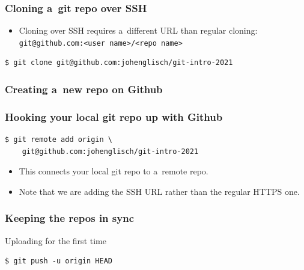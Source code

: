 \documentclass[12pt]{beamer}
\begin{document}
\begin{frame}[fragile]
  \frametitle{Cloning a~git repo over SSH}

  \begin{itemize}
    \item Cloning over SSH requires a~different URL than regular cloning:\\
      {\footnotesize{}\verb"git@github.com:<user name>/<repo name>"}
  \end{itemize}
  {\footnotesize{}%
    \begin{verbatim}
$ git clone git@github.com:johenglisch/git-intro-2021
    \end{verbatim}%
  }
\end{frame}

\begin{frame}
  \frametitle{Creating a~new repo on Github}

\end{frame}

\begin{frame}[fragile]
  \frametitle{Hooking your local git repo up with Github}

  {\footnotesize{}%
    \begin{verbatim}
$ git remote add origin \
    git@github.com:johenglisch/git-intro-2021
    \end{verbatim}%
  }
  \begin{itemize}
    \item This connects your \alert{local} git repo to a~\alert{remote} repo.
    \item Note that we are adding the SSH URL rather than the regular HTTPS one.
  \end{itemize}
\end{frame}

\begin{frame}[fragile]
  \frametitle{Keeping the repos in sync}

  \begin{block}{Uploading for the first time}
    {\footnotesize{}%
      \begin{verbatim}
$ git push -u origin HEAD
      \end{verbatim}%
    }
  \end{block}
\end{frame}
\end{document}
